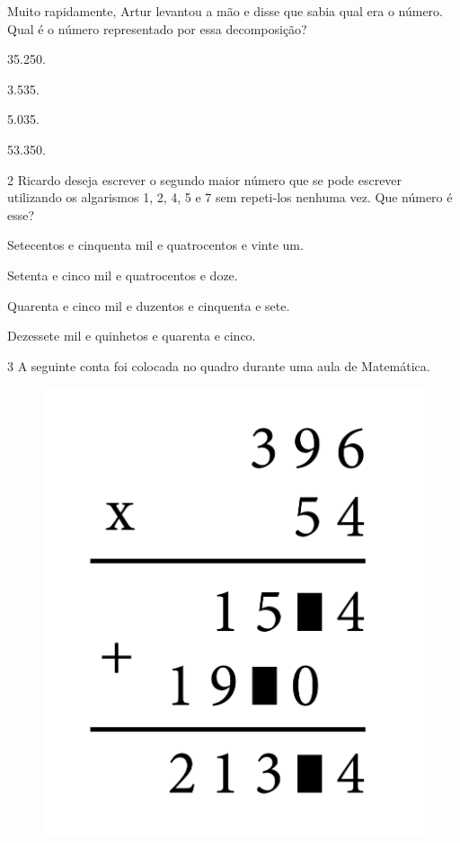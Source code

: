Muito rapidamente, Artur levantou a mão e disse que sabia qual era o
número. Qual é o número representado por essa decomposição?

\begin{escolha}
\item
  35.250.
\item
  3.535.
\item
  5.035.
\item
  53.350.
\end{escolha}


\num{2} Ricardo deseja escrever o segundo maior número que se pode escrever
utilizando os algarismos 1, 2, 4, 5 e 7 sem repeti-los nenhuma vez.
Que número é esse?

\begin{escolha}
\item
  Setecentos e cinquenta mil e quatrocentos e vinte um.
\item
  Setenta e cinco mil e quatrocentos e doze.
\item
  Quarenta e cinco mil e duzentos e cinquenta e sete.
\item
  Dezessete mil e quinhetos e quarenta e cinco.
\end{escolha}


\num{3} A seguinte conta foi colocada no quadro durante uma aula de Matemática.

\begin{figure}[htpb!]
\centering
\includegraphics[width=\textwidth]{media/image83.png}
\end{figure}

